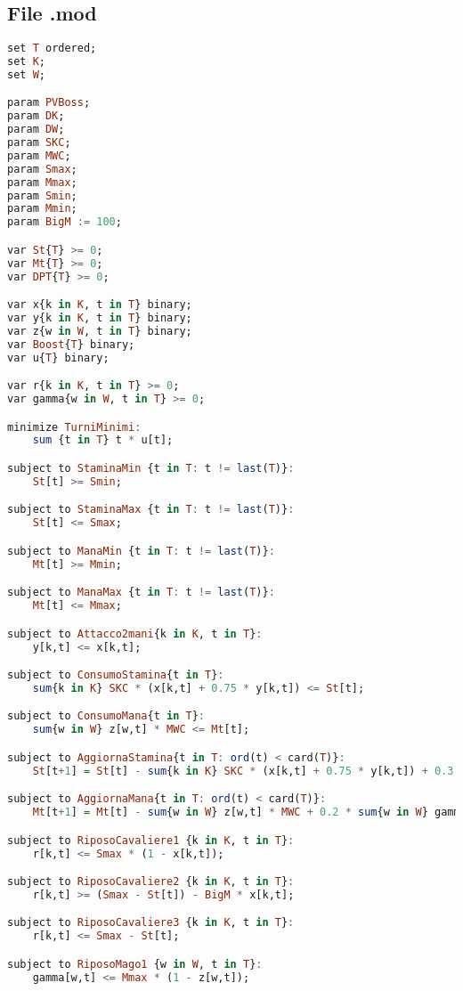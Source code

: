 \documentclass[12pt]{article}
\begin{document}
    \subsection{File .mod}
\begin{lstlisting}[language=haskell, frame=single, caption={Modello in Ampl}, captionpos=b, keywordstyle=\color{purple}]  
set T ordered;
set K; 
set W;

param PVBoss;
param DK;
param DW;
param SKC;
param MWC;
param Smax;
param Mmax;
param Smin;
param Mmin;
param BigM := 100;

var St{T} >= 0;
var Mt{T} >= 0;
var DPT{T} >= 0;

var x{k in K, t in T} binary;  
var y{k in K, t in T} binary;  
var z{w in W, t in T} binary;  
var Boost{T} binary;
var u{T} binary;

var r{k in K, t in T} >= 0;    
var gamma{w in W, t in T} >= 0; 

minimize TurniMinimi:
    sum {t in T} t * u[t];

subject to StaminaMin {t in T: t != last(T)}: 
    St[t] >= Smin;

subject to StaminaMax {t in T: t != last(T)}: 
    St[t] <= Smax;

subject to ManaMin {t in T: t != last(T)}: 
    Mt[t] >= Mmin;

subject to ManaMax {t in T: t != last(T)}: 
    Mt[t] <= Mmax;

subject to Attacco2mani{k in K, t in T}:
    y[k,t] <= x[k,t];

subject to ConsumoStamina{t in T}:
    sum{k in K} SKC * (x[k,t] + 0.75 * y[k,t]) <= St[t];

subject to ConsumoMana{t in T}:
    sum{w in W} z[w,t] * MWC <= Mt[t];

subject to AggiornaStamina{t in T: ord(t) < card(T)}:
    St[t+1] = St[t] - sum{k in K} SKC * (x[k,t] + 0.75 * y[k,t]) + 0.3 * sum{k in K} r[k,t];

subject to AggiornaMana{t in T: ord(t) < card(T)}:
    Mt[t+1] = Mt[t] - sum{w in W} z[w,t] * MWC + 0.2 * sum{w in W} gamma[w,t];

subject to RiposoCavaliere1 {k in K, t in T}:
    r[k,t] <= Smax * (1 - x[k,t]);

subject to RiposoCavaliere2 {k in K, t in T}:
    r[k,t] >= (Smax - St[t]) - BigM * x[k,t];

subject to RiposoCavaliere3 {k in K, t in T}:
    r[k,t] <= Smax - St[t];

subject to RiposoMago1 {w in W, t in T}:
    gamma[w,t] <= Mmax * (1 - z[w,t]);


\end{lstlisting}
\end{document}
